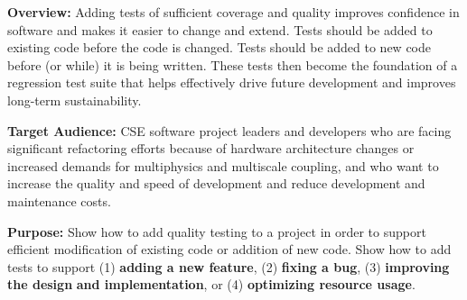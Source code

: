 \documentclass[]{article}
\date{}
\begin{document}
\pagestyle{fancy}
\renewcommand{\headrulewidth}{0pt}
  
\thispagestyle{empty}
\textbf{\newline}
\textbf{\newline}
\textbf{\newline}

\textbf{Overview:} Adding tests of sufficient coverage and quality
improves confidence in software and makes it easier to change and
extend. Tests should be added to existing code before the code is
changed. Tests should be added to new code before (or while) it is being
written. These tests then become the foundation of a regression test
suite that helps effectively drive future development and improves
long-term sustainability.

\textbf{Target Audience:} CSE software project leaders and developers
who are facing significant refactoring efforts because of hardware
architecture changes or increased demands for multiphysics and
multiscale coupling, and who want to increase the quality and speed of
development and reduce development and maintenance costs.

\textbf{Purpose:} Show how to add quality testing to a project in order
to support efficient modification of existing code or addition of new
code. Show how to add tests to support (1) \textbf{adding a new
feature}, (2) \textbf{fixing a bug}, (3) \textbf{improving the design}
\textbf{and implementation}, or (4) \textbf{optimizing resource usage}.
\end{document}
